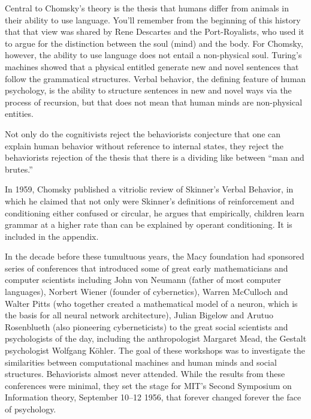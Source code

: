 \begin{refsection}
Central to Chomsky's theory is the thesis that humans differ from animals in their ability to use language. You'll remember from the beginning of this history that that view was shared by Rene Descartes and the Port-Royalists, who used it to argue for the distinction between the soul (mind) and the body. For Chomsky, however, the ability to use language does not entail a non-physical soul. Turing's machines showed that a physical entitled generate new and novel sentences that follow the grammatical structures. Verbal behavior, the defining feature of human psychology, is the ability to structure sentences in new and novel ways via the process of recursion, but that does not mean that human minds are non-physical entities.

Not only do the cognitivists reject the behaviorists conjecture that one can explain human behavior without reference to internal states, they reject the behaviorists rejection of the thesis that there is a dividing like between ``man and brutes.''

In 1959, Chomsky published a vitriolic review of Skinner's Verbal Behavior, in which he claimed that not only were Skinner's definitions of reinforcement and conditioning either confused or circular, he argues that empirically, children learn grammar at a higher rate than can be explained by operant conditioning. It is included in the appendix.

In the decade before these tumultuous years, the Macy foundation had sponsored series of conferences that introduced some of great early mathematicians and computer scientists including John von Neumann (father of most computer languages), Norbert Wiener (founder of cybernetics), Warren McCulloch and Walter Pitts (who together created a mathematical model of a neuron, which is the basis for all neural network architecture), Julian Bigelow and Arutuo Rosenblueth (also pioneering cyberneticists) to the great social scientists and psychologists of the day, including the anthropologist Margaret Mead, the Gestalt psychologist Wolfgang Köhler. The goal of these workshops was to investigate the similarities between computational machines and human minds and social structures. Behaviorists almost never attended. While the results from these conferences were minimal, they set the stage for MIT's Second Symposium on Information theory, September 10--12 1956, that forever changed forever the face of psychology. 


\end{refsection}
